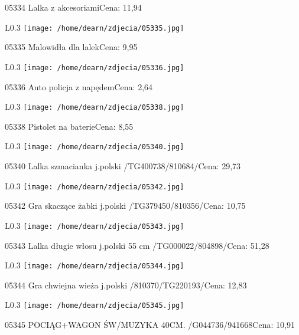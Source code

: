 05334 Lalka z akcesoriamiCena: 11,94\newline
\begin{wrapfigure}{L}{0.3\textwidth}
\texttt{[image: /home/dearn/zdjecia/05335.jpg]}
\end{wrapfigure}
05335 Malowidła dla lalekCena: 9,95\newline
\begin{wrapfigure}{L}{0.3\textwidth}
\texttt{[image: /home/dearn/zdjecia/05336.jpg]}
\end{wrapfigure}
05336 Auto policja z napędemCena: 2,64\newline
\begin{wrapfigure}{L}{0.3\textwidth}
\texttt{[image: /home/dearn/zdjecia/05338.jpg]}
\end{wrapfigure}
05338 Pistolet na baterieCena: 8,55\newline
\begin{wrapfigure}{L}{0.3\textwidth}
\texttt{[image: /home/dearn/zdjecia/05340.jpg]}
\end{wrapfigure}
05340 Lalka szmacianka j.polski /TG400738/810684/Cena: 29,73\newline
\begin{wrapfigure}{L}{0.3\textwidth}
\texttt{[image: /home/dearn/zdjecia/05342.jpg]}
\end{wrapfigure}
05342 Gra skaczące żabki j.polski /TG379450/810356/Cena: 10,75\newline
\begin{wrapfigure}{L}{0.3\textwidth}
\texttt{[image: /home/dearn/zdjecia/05343.jpg]}
\end{wrapfigure}
05343 Lalka długie włosu j.polski 55 cm /TG000022/804898/Cena: 51,28\newline
\begin{wrapfigure}{L}{0.3\textwidth}
\texttt{[image: /home/dearn/zdjecia/05344.jpg]}
\end{wrapfigure}
05344 Gra chwiejna wieża j.polski /810370/TG220193/Cena: 12,83\newline
\begin{wrapfigure}{L}{0.3\textwidth}
\texttt{[image: /home/dearn/zdjecia/05345.jpg]}
\end{wrapfigure}
05345 POCIĄG+WAGON ŚW/MUZYKA 40CM. /G044736/941668Cena: 10,91\newline
